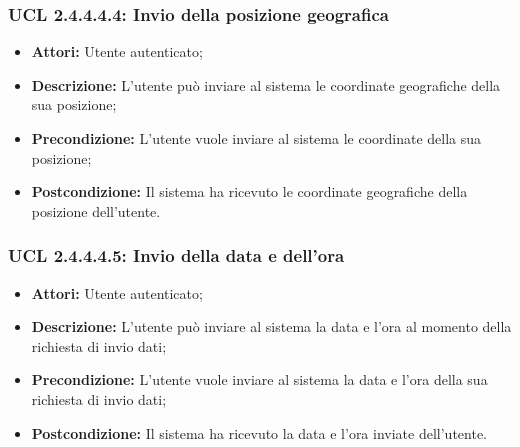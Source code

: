 \subsubsection{UCL 2.4.4.4.4: Invio della posizione geografica}
\begin{itemize}
\item \textbf{Attori:} Utente autenticato;
\item \textbf{Descrizione:} L'utente può inviare al sistema le coordinate geografiche della sua posizione;
\item \textbf{Precondizione:} L'utente vuole inviare al sistema le coordinate della sua posizione;
\item \textbf{Postcondizione:} Il sistema ha ricevuto le coordinate geografiche della posizione dell'utente.
\end{itemize}

\hypertarget{L2.4.4.4.5}{}
\subsubsection{UCL 2.4.4.4.5: Invio della data e dell'ora}
\begin{itemize}
\item \textbf{Attori:} Utente autenticato;
\item \textbf{Descrizione:} L'utente può inviare al sistema la data e l'ora al momento della richiesta di invio dati;
\item \textbf{Precondizione:} L'utente vuole inviare al sistema la data e l'ora della sua richiesta di invio dati;
\item \textbf{Postcondizione:} Il sistema ha ricevuto la data e l'ora inviate dell'utente.
\end{itemize}

\hypertarget{L2.4.4.5}{}

